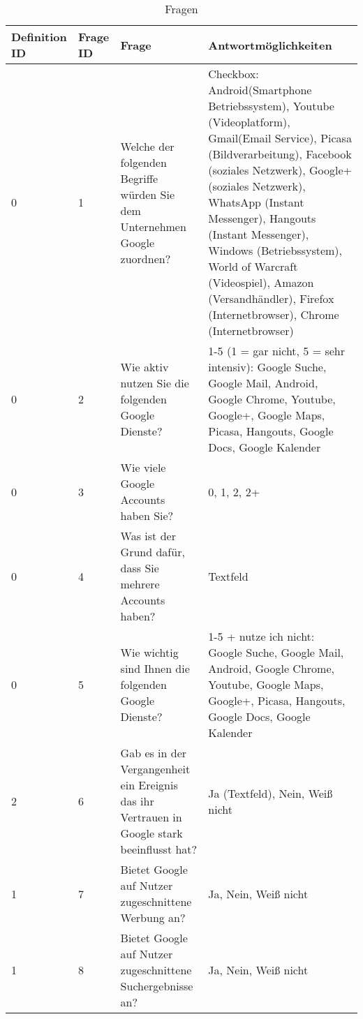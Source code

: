 \begin{table}
	\begin{tabular}[]{ p{1.5cm} | p{1.5cm} | p{5cm} | p{5cm} }
	\hline
	Definition ID & Frage ID & Frage & Antwortmöglichkeiten \\
	\hline \hline
	0 & 1 & Welche der folgenden Begriffe würden Sie dem Unternehmen Google zuordnen? & Checkbox: Android(Smartphone Betriebssystem), Youtube (Videoplatform), Gmail(Email Service), Picasa (Bildverarbeitung), Facebook (soziales Netzwerk), Google+ (soziales Netzwerk), WhatsApp (Instant Messenger), Hangouts (Instant Messenger), Windows (Betriebssystem), World of Warcraft (Videospiel), Amazon (Versandhändler), Firefox (Internetbrowser), Chrome (Internetbrowser)\\
	\hline
	0 & 2 & Wie aktiv nutzen Sie die folgenden Google Dienste? & 1-5 (1 = gar nicht, 5 = sehr intensiv): Google Suche, Google Mail, Android, Google Chrome, Youtube, Google+, Google Maps, Picasa, Hangouts, Google Docs, Google Kalender\\
	\hline
	0 & 3 & Wie viele Google Accounts haben Sie? & 0, 1, 2, 2+\\
	\hline
	0 & 4 & Was ist der Grund dafür, dass Sie mehrere Accounts haben? & Textfeld\\
	\hline
	0 & 5 & Wie wichtig sind Ihnen die folgenden Google Dienste? & 1-5 + nutze ich nicht: Google Suche, Google Mail, Android, Google Chrome, Youtube, Google Maps, Google+, Picasa, Hangouts, Google Docs, Google Kalender\\
	\hline
	2 & 6 & Gab es in der Vergangenheit ein Ereignis das ihr Vertrauen in Google stark beeinflusst hat? & Ja (Textfeld), Nein, Weiß nicht\\
	\hline
	1 & 7 & Bietet Google auf Nutzer zugeschnittene Werbung an? & Ja, Nein, Weiß nicht\\
	\hline
	1 & 8 & Bietet Google auf Nutzer zugeschnittene Suchergebnisse an? & Ja, Nein, Weiß nicht\\
	\hline
	
	\end{tabular}
	\caption{Fragen}\label{addendumquestions}
\end{table}

